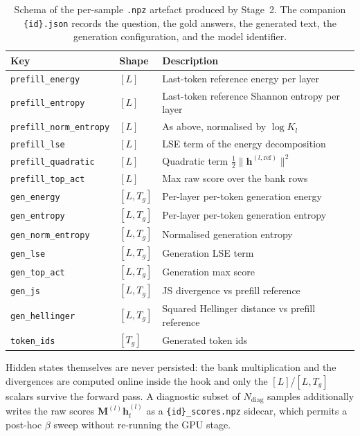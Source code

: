 \begin{table}[H]
    \centering
    \small
    \begin{tabular}{lll}
        \toprule
        Key & Shape & Description \\
        \midrule
        \texttt{prefill\_energy}        & $[L]$       & Last-token reference energy per layer \\
        \texttt{prefill\_entropy}       & $[L]$       & Last-token reference Shannon entropy per layer \\
        \texttt{prefill\_norm\_entropy} & $[L]$       & As above, normalised by $\log K_l$ \\
        \texttt{prefill\_lse}           & $[L]$       & LSE term of the energy decomposition \\
        \texttt{prefill\_quadratic}     & $[L]$       & Quadratic term $\tfrac{1}{2}\|\mathbf{h}^{(l,\mathrm{ref})}\|^2$ \\
        \texttt{prefill\_top\_act}      & $[L]$       & Max raw score over the bank rows \\
        \texttt{gen\_energy}            & $[L, T_g]$  & Per-layer per-token generation energy \\
        \texttt{gen\_entropy}           & $[L, T_g]$  & Per-layer per-token generation entropy \\
        \texttt{gen\_norm\_entropy}     & $[L, T_g]$  & Normalised generation entropy \\
        \texttt{gen\_lse}               & $[L, T_g]$  & Generation LSE term \\
        \texttt{gen\_top\_act}          & $[L, T_g]$  & Generation max score \\
        \texttt{gen\_js}                & $[L, T_g]$  & JS divergence vs prefill reference \\
        \texttt{gen\_hellinger}         & $[L, T_g]$  & Squared Hellinger distance vs prefill reference \\
        \texttt{token\_ids}             & $[T_g]$     & Generated token ids \\
        \bottomrule
    \end{tabular}
    \caption{Schema of the per-sample \texttt{.npz} artefact produced by
    Stage~2. The companion \texttt{\{id\}.json} records the question, the
    gold answers, the generated text, the generation configuration, and
    the model identifier.}
    \label{tab:npz_schema}
\end{table}

Hidden states themselves are never persisted: the bank multiplication and
the divergences are computed online inside the hook and only the
$[L]$/$[L, T_g]$ scalars survive the forward pass. A diagnostic subset
of $N_{\mathrm{diag}}$ samples additionally writes the raw scores
$\mathbf{M}^{(l)}\mathbf{h}_t^{(l)}$ as a \texttt{\{id\}\_scores.npz}
sidecar, which permits a post-hoc $\beta$ sweep without re-running the
GPU stage.

